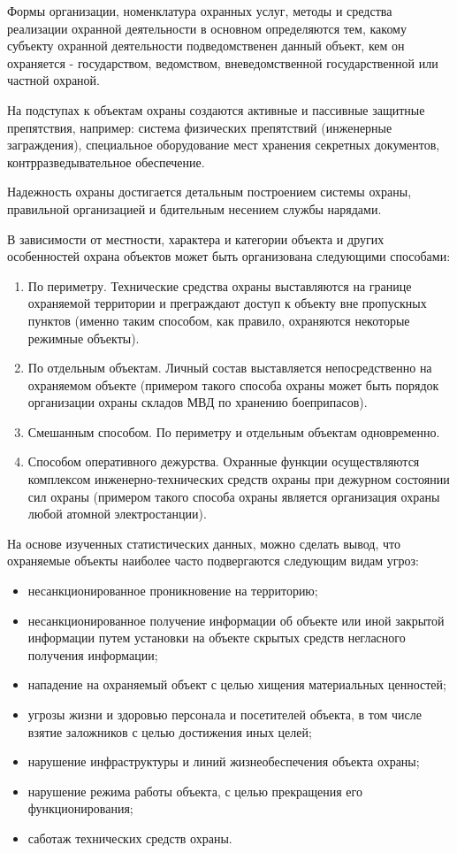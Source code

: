 Формы организации, номенклатура охранных услуг, методы и средства реализации охранной деятельности в основном определяются тем, какому субъекту охранной деятельности подведомственен данный объект, кем он охраняется - государством, ведомством, вневедомственной государственной или частной охраной.

На подступах к объектам охраны создаются активные и пассивные защитные препятствия, например: система физических препятствий (инженерные заграждения), специальное оборудование мест хранения секретных документов, контрразведывательное обеспечение.

Надежность охраны достигается детальным построением системы охраны, правильной организацией и бдительным несением службы нарядами.

В зависимости от местности, характера и категории объекта и других особенностей охрана объектов может быть организована следующими способами:
\begin{enumerate}
    \item По периметру. Технические средства охраны выставляются на границе охраняемой территории и преграждают доступ к объекту вне пропускных пунктов (именно таким способом, как правило, охраняются некоторые режимные объекты).
    \item По отдельным объектам. Личный состав выставляется непосредственно на охраняемом объекте (примером такого способа охраны может быть порядок организации охраны складов МВД по хранению боеприпасов).
    \item Смешанным способом. По периметру и отдельным объектам одновременно.
    \item Способом оперативного дежурства. Охранные функции осуществляются комплексом инженерно-технических средств охраны при дежурном состоянии сил охраны (примером такого способа охраны является организация охраны любой атомной электростанции).
\end{enumerate}

На основе изученных статистических данных, можно сделать вывод, что охраняемые объекты наиболее часто подвергаются следующим видам угроз:
\begin{itemize}
    \item несанкционированное проникновение на территорию;
    \item несанкционированное получение информации об объекте или иной закрытой информации путем установки на объекте скрытых средств негласного получения информации;
    \item нападение на охраняемый объект с целью хищения материальных ценностей;
    \item угрозы жизни и здоровью персонала и посетителей объекта, в том числе взятие заложников с целью достижения иных целей;
    \item нарушение инфраструктуры и линий жизнеобеспечения объекта охраны;
    \item нарушение режима работы объекта, с целью прекращения его функционирования;
    \item саботаж технических средств охраны.
\end{itemize}


